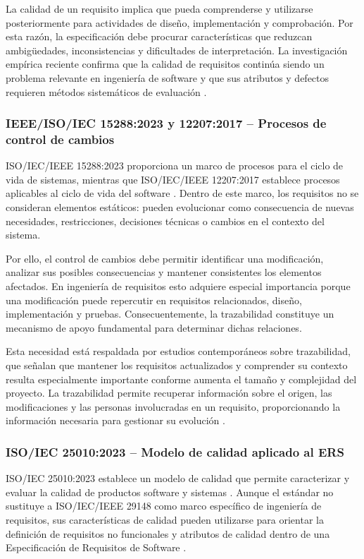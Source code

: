 \documentclass[journal,onecolumn]{IEEEtran}
\begin{document}
	La calidad de un requisito implica que pueda comprenderse y utilizarse posteriormente para actividades de diseño, implementación y comprobación. Por esta razón, la especificación debe procurar características que reduzcan ambigüedades, inconsistencias y dificultades de interpretación. La investigación empírica reciente confirma que la calidad de requisitos continúa siendo un problema relevante en ingeniería de software y que sus atributos y defectos requieren métodos sistemáticos de evaluación \cite{Montgomery2022}.
	
	\subsubsection{IEEE/ISO/IEC 15288:2023 y 12207:2017 -- Procesos de control de cambios}
	
	ISO/IEC/IEEE 15288:2023 proporciona un marco de procesos para el ciclo de vida de sistemas, mientras que ISO/IEC/IEEE 12207:2017 establece procesos aplicables al ciclo de vida del software \cite{ISO15288-2023, ISO12207-2017}. Dentro de este marco, los requisitos no se consideran elementos estáticos: pueden evolucionar como consecuencia de nuevas necesidades, restricciones, decisiones técnicas o cambios en el contexto del sistema.
	
	Por ello, el control de cambios debe permitir identificar una modificación, analizar sus posibles consecuencias y mantener consistentes los elementos afectados. En ingeniería de requisitos esto adquiere especial importancia porque una modificación puede repercutir en requisitos relacionados, diseño, implementación y pruebas. Consecuentemente, la trazabilidad constituye un mecanismo de apoyo fundamental para determinar dichas relaciones.
	
	Esta necesidad está respaldada por estudios contemporáneos sobre trazabilidad, que señalan que mantener los requisitos actualizados y comprender su contexto resulta especialmente importante conforme aumenta el tamaño y complejidad del proyecto. La trazabilidad permite recuperar información sobre el origen, las modificaciones y las personas involucradas en un requisito, proporcionando la información necesaria para gestionar su evolución \cite{Mucha2024}.
	
	\subsubsection{ISO/IEC 25010:2023 -- Modelo de calidad aplicado al ERS}
	
	ISO/IEC 25010:2023 establece un modelo de calidad que permite caracterizar y evaluar la calidad de productos software y sistemas \cite{ISO25010-2023}. Aunque el estándar no sustituye a ISO/IEC/IEEE 29148 como marco específico de ingeniería de requisitos, sus características de calidad pueden utilizarse para orientar la definición de requisitos no funcionales y atributos de calidad dentro de una Especificación de Requisitos de Software \cite{ISO29148-2018}.
	
\end{document}
